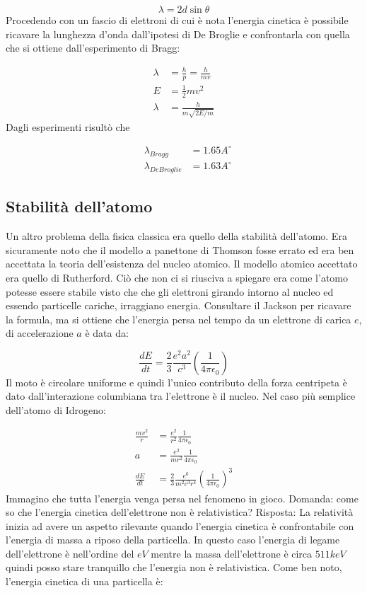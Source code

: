 \documentclass[11pt,a4paper]{article}
\begin{document}
\begin{equation}
\lambda = 2d\sin\theta
\end{equation}
Procedendo con un fascio di elettroni di cui è nota l'energia cinetica è possibile ricavare la lunghezza d'onda dall'ipotesi di De Broglie e confrontarla con quella che si ottiene dall'esperimento di Bragg:

\begin{align}
\lambda &= \frac{h}{p} = \frac{h}{mv} \\ \nonumber
E &= \frac{1}{2} m v^2 \\ \nonumber
\lambda &= \frac{h}{m \sqrt{2E/m}}
\end{align}
Dagli esperimenti risultò che

\begin{align}
& \lambda_{Bragg} &= 1.65 A^{\circ} \\ \nonumber
& \lambda_{De Broglie} &= 1.63 A^{\circ} 
\end{align}

\subsection{Stabilità dell'atomo}
Un altro problema della fisica classica era quello della stabilità dell'atomo. Era sicuramente noto che il modello a panettone di Thomson fosse errato ed era ben accettata la teoria dell'esistenza del nucleo atomico. Il modello atomico accettato era quello di Rutherford. Ciò che non ci si riusciva a spiegare era come l'atomo potesse essere stabile visto che che gli elettroni girando intorno al nucleo ed essendo particelle cariche, irraggiano energia. Consultare il Jackson per ricavare la formula, ma si ottiene che l'energia persa nel tempo da un elettrone di carica $ e $, di accelerazione $ a $ è data da:

\begin{equation}
\frac{dE}{dt}  = \frac{2}{3} \frac{e^2a^2}{c^3} \left(\frac{1}{4\pi\epsilon_0}\right)
\end{equation}
Il moto è circolare uniforme e quindi l'unico contributo della forza centripeta è dato dall'interazione columbiana tra l'elettrone è il nucleo. Nel caso più semplice dell'atomo di Idrogeno:

\begin{align}
\frac{mv^2}{r} &= \frac{e^2}{r^2}\frac{1}{4\pi\epsilon_0} \\ \nonumber
 a &= \frac{e^2}{mr^2}\frac{1}{4\pi\epsilon_0} \\ \nonumber
\frac{dE}{dt} &= \frac{2}{3}\frac{e^6}{m^2c^3r^4}\left(\frac{1}{4\pi\epsilon_0}\right)^3
\end{align}
Immagino che tutta l'energia venga persa nel fenomeno in gioco. 
Domanda: come so che l'energia cinetica dell'elettrone non è relativistica? Risposta: La relatività inizia ad avere un aspetto rilevante quando l'energia cinetica è confrontabile con l'energia di massa a riposo della particella. In questo caso l'energia di legame dell'elettrone è nell'ordine del $ eV $ mentre la massa dell'elettrone è circa $ 511 keV $ quindi posso stare tranquillo che l'energia non è relativistica.
Come ben noto, l'energia cinetica di una particella è:
\end{document}
